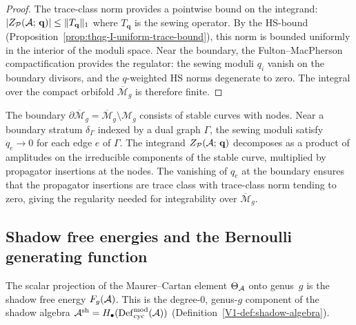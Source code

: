 \begin{proof}
The trace-class norm provides a pointwise bound on the integrand: $|Z_{\mathcal{P}}(\mathcal{A};\,\mathbf{q})| \leq \|T_{\mathbf{q}}\|_1$ where $T_{\mathbf{q}}$ is the sewing operator. By the HS-bound (Proposition~\ref{prop:thqg-I-uniform-trace-bound}), this norm is bounded uniformly in the interior of the moduli space. Near the boundary, the Fulton--MacPherson compactification provides the regulator: the sewing moduli $q_i$ vanish on the boundary divisors, and the $q$-weighted HS norms degenerate to zero. The integral over the compact orbifold $\overline{\mathcal{M}}_g$ is therefore finite.
\end{proof}

\begin{remark}
The boundary $\partial\overline{\mathcal{M}}_g = \overline{\mathcal{M}}_g \setminus \mathcal{M}_g$ consists of stable curves with nodes. Near a boundary stratum $\delta_\Gamma$ indexed by a dual graph $\Gamma$, the sewing moduli satisfy $q_e \to 0$ for each edge $e$ of $\Gamma$. The integrand $Z_{\mathcal{P}}(\mathcal{A};\,\mathbf{q})$ decomposes as a product of amplitudes on the irreducible components of the stable curve, multiplied by propagator insertions at the nodes. The vanishing of $q_e$ at the boundary ensures that the propagator insertions are trace class with trace-class norm tending to zero, giving the regularity needed for integrability over $\overline{\mathcal{M}}_g$.
\end{remark}



\subsection{Shadow free energies and the Bernoulli generating function}
\label{subsec:thqg-I-shadow-free-energies}

The scalar projection of the Maurer--Cartan element $\Theta_{\mathcal{A}}$ onto genus~$g$ is the shadow free energy $F_g(\mathcal{A})$. This is the degree-$0$, genus-$g$ component of the shadow algebra $\mathcal{A}^{\mathrm{sh}} = H_\bullet(\operatorname{Def}_{\mathrm{cyc}}^{\mathrm{mod}}(\mathcal{A}))$ (Definition~\ref{V1-def:shadow-algebra}).

